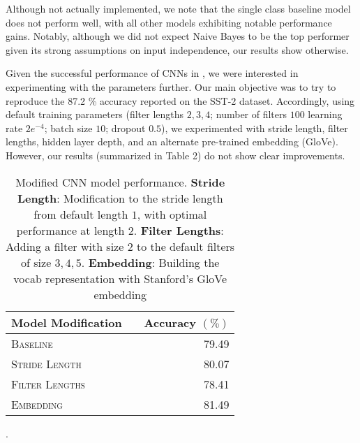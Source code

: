 \documentclass[11pt]{article}
\begin{document}
Although not actually implemented, we note that the single class baseline model does not perform well, with all other models exhibiting notable performance gains. Notably, although we did not expect Naive Bayes to be the top performer given its strong assumptions on input independence, our results show otherwise. 

Given the successful performance of CNNs in \citet{DBLP:journals/corr/Kim14f}, we were interested in experimenting with the parameters further. Our main objective was to try to reproduce the 87.2 \% accuracy reported on the SST-2 dataset. Accordingly, using default training parameters (filter lengths $2, 3, 4$; number of filters $100$ learning rate $2e^{-4}$; batch size $10$; dropout $0.5$), we experimented with stride length, filter lengths, hidden layer depth, and an alternate pre-trained embedding (GloVe). However, our results (summarized in Table 2) do not show clear improvements.

\begin{table}[h]
\centering
\begin{tabular}{llr}
 \toprule
Model Modification &  & Accuracy $(\%)$ \\
 \midrule
 \textsc{Baseline} & & 79.49\\
 \textsc{Stride Length} & & 80.07 \\
 \textsc{Filter Lengths} & & 78.41  \\
 \textsc{Embedding} & &81.49 \\
 \bottomrule
\end{tabular}
\caption{\label{tab:results} Modified CNN model performance. \textbf{Stride Length}: Modification to the stride length from default length $1$, with optimal performance at length $2$. \textbf{Filter Lengths}: Adding a filter with size $2$ to the default filters of size $3, 4, 5$. \textbf{Embedding}: Building the vocab representation with Stanford's GloVe embedding}.
\end{table}



\end{document}
